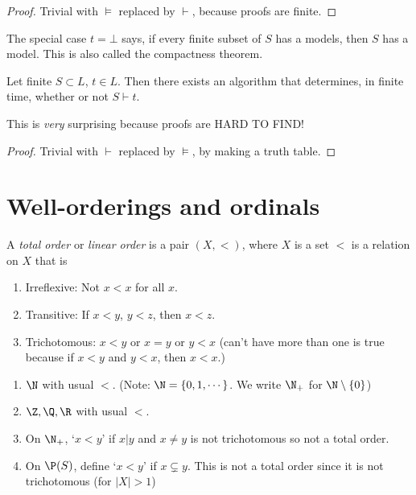 \documentclass[a4paper]{article}
\begin{document}
\begin{proof}
  Trivial with $\models$ replaced by $\vdash$, because proofs are finite.
\end{proof}
The special case $t = \bot$ says, if every finite subset of $S$ has a models, then $S$ has a model. This is also called the compactness theorem.

\begin{cor}
  Let finite $S\subset L$, $t\in L$. Then there exists an algorithm that determines, in finite time, whether or not $S\vdash t$.
\end{cor}
This is \emph{very} surprising because proofs are HARD TO FIND!
\begin{proof}
  Trivial with $\vdash$ replaced by $\models$, by making a truth table.
\end{proof}
\section{Well-orderings and ordinals}
\begin{defi}
  A \emph{total order} or \emph{linear order} is a pair $(X, <)$, where $X$ is a set $<$ is a relation on $X$ that is
  \begin{enumerate}
    \item Irreflexive: Not $x < x$ for all $x$.
    \item Transitive: If $x < y$, $y < z$, then $x < z$.
    \item Trichotomous: $x < y$ or $x = y$ or $y < x$ (can't have more than one is true because if $x < y$ and $y < x$, then $x < x$.)
  \end{enumerate}
\end{defi}

\begin{eg}\leavevmode
  \begin{enumerate}
    \item $\N$ with usual $<$. (Note: $\N = \{0, 1, \cdots\}$. We write $\N_+$ for $\N\setminus\{0\}$)
    \item $\Z, \Q, \R$ with usual $<$.
    \item On $\N_+$, `$x < y$' if $x|y$ and $x \not=y$ is not trichotomous so not a total order.
    \item On $\P(S)$, define `$x<y$' if $x\subsetneq y$. This is not a total order since it is not trichotomous (for $|X| > 1$)
  \end{enumerate}
\end{eg}
\end{document}

